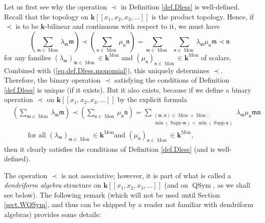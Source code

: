\documentclass
[numbers=enddot,12pt,final,onecolumn,notitlepage,abstracton]{scrartcl}%
\theoremstyle{definition}
\let\sumnonlimits\sum
\renewcommand{\sum}{\sumnonlimits\limits}
\begin{document}
Let us first see why the operation $\left.  \prec\right.  $ in Definition
\ref{def.Dless} is well-defined. Recall that the topology on $\mathbf{k}%
\left[  \left[  x_{1},x_{2},x_{3},\ldots\right]  \right]  $ is the product
topology. Hence, if $\left.  \prec\right.  $ is to be $\mathbf{k}$-bilinear
and continuous with respect to it, we must have%
\[
\left(  \sum_{\mathfrak{m}\in\operatorname*{Mon}}\lambda_{\mathfrak{m}%
}\mathfrak{m}\right)  \left.  \prec\right.  \left(  \sum_{\mathfrak{n}%
\in\operatorname*{Mon}}\mu_{\mathfrak{n}}\mathfrak{n}\right)  =\sum
_{\mathfrak{m}\in\operatorname*{Mon}}\ \ \sum_{\mathfrak{n}\in
\operatorname*{Mon}}\lambda_{\mathfrak{m}}\mu_{\mathfrak{n}}\mathfrak{m}%
\left.  \prec\right.  \mathfrak{n}%
\]
for any families $\left(  \lambda_{\mathfrak{m}}\right)  _{\mathfrak{m}%
\in\operatorname*{Mon}}\in\mathbf{k}^{\operatorname*{Mon}}$ and $\left(
\mu_{\mathfrak{n}}\right)  _{\mathfrak{n}\in\operatorname*{Mon}}\in
\mathbf{k}^{\operatorname*{Mon}}$ of scalars. Combined with
(\ref{eq.def.Dless.monomial}), this uniquely determines $\left.  \prec\right.
$. Therefore, the binary operation $\left.  \prec\right.  $ satisfying the
conditions of Definition \ref{def.Dless} is unique (if it exists). But it also
exists, because if we define a binary operation $\left.  \prec\right.  $ on
$\mathbf{k}\left[  \left[  x_{1},x_{2},x_{3},\ldots\right]  \right]  $ by the
explicit formula%
\begin{align*}
&  \left(  \sum_{\mathfrak{m}\in\operatorname*{Mon}}\lambda_{\mathfrak{m}%
}\mathfrak{m}\right)  \left.  \prec\right.  \left(  \sum_{\mathfrak{n}%
\in\operatorname*{Mon}}\mu_{\mathfrak{n}}\mathfrak{n}\right)  =\sum
_{\substack{\left(  \mathfrak{m},\mathfrak{n}\right)  \in\operatorname*{Mon}%
\times\operatorname*{Mon}\text{;}\\\min\left(  \operatorname*{Supp}%
\mathfrak{m}\right)  <\min\left(  \operatorname*{Supp}\mathfrak{n}\right)
}}\lambda_{\mathfrak{m}}\mu_{\mathfrak{n}}\mathfrak{mn}\\
&  \ \ \ \ \ \ \ \ \ \ \text{for all }\left(  \lambda_{\mathfrak{m}}\right)
_{\mathfrak{m}\in\operatorname*{Mon}}\in\mathbf{k}^{\operatorname*{Mon}}\text{
and }\left(  \mu_{\mathfrak{n}}\right)  _{\mathfrak{n}\in\operatorname*{Mon}%
}\in\mathbf{k}^{\operatorname*{Mon}},
\end{align*}
then it clearly satisfies the conditions of Definition \ref{def.Dless} (and is well-defined).

The operation $\left.  \prec\right.  $ is not associative; however, it is part
of what is called a \textit{dendriform algebra} structure on $\mathbf{k}%
\left[  \left[  x_{1},x_{2},x_{3},\ldots\right]  \right]  $ (and on
$\operatorname*{QSym}$, as we shall see below). The following remark (which
will not be used until Section \ref{sect.WQSym}, and thus can be skipped by a
reader not familiar with dendriform algebras) provides some details:
\end{document}
